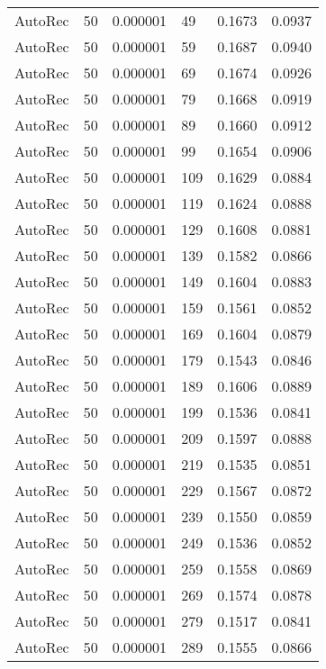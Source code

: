 \begin{tabular}{llrlrr}
 AutoRec &   50 &  0.000001 &    49 &  0.1673 &       0.0937 \\
 AutoRec &   50 &  0.000001 &    59 &  0.1687 &       0.0940 \\
 AutoRec &   50 &  0.000001 &    69 &  0.1674 &       0.0926 \\
 AutoRec &   50 &  0.000001 &    79 &  0.1668 &       0.0919 \\
 AutoRec &   50 &  0.000001 &    89 &  0.1660 &       0.0912 \\
 AutoRec &   50 &  0.000001 &    99 &  0.1654 &       0.0906 \\
 AutoRec &   50 &  0.000001 &   109 &  0.1629 &       0.0884 \\
 AutoRec &   50 &  0.000001 &   119 &  0.1624 &       0.0888 \\
 AutoRec &   50 &  0.000001 &   129 &  0.1608 &       0.0881 \\
 AutoRec &   50 &  0.000001 &   139 &  0.1582 &       0.0866 \\
 AutoRec &   50 &  0.000001 &   149 &  0.1604 &       0.0883 \\
 AutoRec &   50 &  0.000001 &   159 &  0.1561 &       0.0852 \\
 AutoRec &   50 &  0.000001 &   169 &  0.1604 &       0.0879 \\
 AutoRec &   50 &  0.000001 &   179 &  0.1543 &       0.0846 \\
 AutoRec &   50 &  0.000001 &   189 &  0.1606 &       0.0889 \\
 AutoRec &   50 &  0.000001 &   199 &  0.1536 &       0.0841 \\
 AutoRec &   50 &  0.000001 &   209 &  0.1597 &       0.0888 \\
 AutoRec &   50 &  0.000001 &   219 &  0.1535 &       0.0851 \\
 AutoRec &   50 &  0.000001 &   229 &  0.1567 &       0.0872 \\
 AutoRec &   50 &  0.000001 &   239 &  0.1550 &       0.0859 \\
 AutoRec &   50 &  0.000001 &   249 &  0.1536 &       0.0852 \\
 AutoRec &   50 &  0.000001 &   259 &  0.1558 &       0.0869 \\
 AutoRec &   50 &  0.000001 &   269 &  0.1574 &       0.0878 \\
 AutoRec &   50 &  0.000001 &   279 &  0.1517 &       0.0841 \\
 AutoRec &   50 &  0.000001 &   289 &  0.1555 &       0.0866 \\

\end{tabular}
